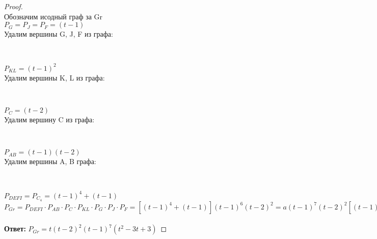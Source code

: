 \begin{proof} $ $\\
    Обозначим исодный граф за Gr\\
    $P_G = P_J = P_F = (t-1)$\\
    Удалим вершины G, J, F из графа:
    \begin{center}
    \\
    \end{center}
    $P_{KL} = (t-1)^2$\\
    Удалим вершины K, L из графа:
    \begin{center}
    \\
    \end{center}
    $P_C = (t-2)$\\
    Удалим вершину C из графа:
    \begin{center}
    \\
    \end{center}
    $P_{AB} = (t-1)(t-2)$\\
    Удалим вершины A, B графа:
    \begin{center}
    \\
    \end{center}
    $P_{DEFI} = P_{C_4} = (t-1)^4+(t-1)$\\
    $P_{Gr} = P_{DEFI} \cdot P_{AB} \cdot P_{C} \cdot P_{KL} \cdot P_G \cdot P_J \cdot P_F = [(t-1)^4+(t-1)](t-1)^6(t-2)^2 = a(t-1)^7(t-2)^2[(t-1)^3 + 1]$\\\\
    \textbf{Ответ: } $P_{Gr} = t(t-2)^2(t-1)^7(t^2-3t+3) $
    
\end{proof}